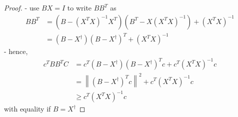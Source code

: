 \begin{proof}
    - use $ B X=I $ to write $ B B^{T} $ as
$$
\begin{aligned}
B B^{T} &=\left(B-\left(X^{T} X\right)^{-1} X^{T}\right)\left(B^{T}-X\left(X^{T} X\right)^{-1}\right)+\left(X^{T} X\right)^{-1} \\
&=\left(B-X^{\dagger}\right)\left(B-X^{\dagger}\right)^{T}+\left(X^{T} X\right)^{-1}
\end{aligned}
$$
- hence,
$$
\begin{aligned}
c^{T} B B^{T} C &=c^{T}\left(B-X^{\dagger}\right)\left(B-X^{\dagger}\right)^{T} c+c^{T}\left(X^{T} X\right)^{-1} c \\
&=\left\|\left(B-X^{\dagger}\right)^{T} c\right\|^{2}+c^{T}\left(X^{T} X\right)^{-1} c \\
& \geq c^{T}\left(X^{T} X\right)^{-1} c
\end{aligned}
$$
with equality if $ B=X^{\dagger} $
\end{proof}